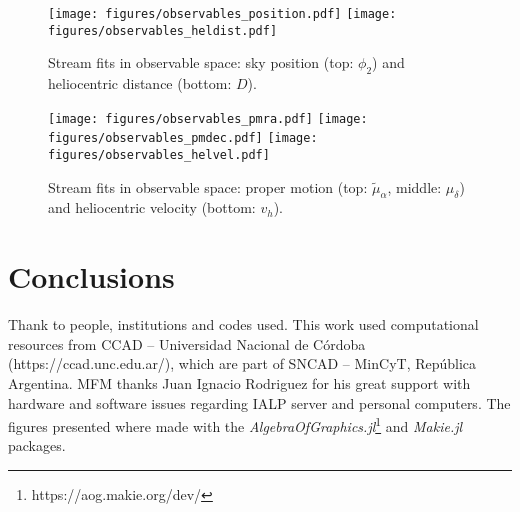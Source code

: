 \documentclass[twocolumn]{aa}
\begin{document}
\begin{figure*}
   \centering
   \texttt{[image: figures/observables\_position.pdf]}
   \texttt{[image: figures/observables\_heldist.pdf]}
   \caption{Stream fits in observable space: sky position (top: $\phi_2$) and heliocentric distance (bottom: $D$).}
   \label{fig:obs_pos}
\end{figure*}
\begin{figure*}
   \texttt{[image: figures/observables\_pmra.pdf]}
   \texttt{[image: figures/observables\_pmdec.pdf]}
   \texttt{[image: figures/observables\_helvel.pdf]}
   \caption{Stream fits in observable space: proper motion (top: $\tilde{\mu}_\alpha$, middle: $\mu_\delta$) and heliocentric velocity (bottom: $v_h$).}
   \label{fig:obs_vel}
\end{figure*}



\section{Conclusions}
\label{sec:conclusions}



\begin{acknowledgements}
    Thank to people, institutions and codes used.
    This work used computational resources from CCAD – Universidad Nacional de Córdoba (https://ccad.unc.edu.ar/), which are part of SNCAD – MinCyT, República Argentina.
    MFM thanks Juan Ignacio Rodriguez for his great support with hardware and
    software issues regarding IALP server and personal computers.
    The figures presented where made with the
    {\it AlgebraOfGraphics.jl}\footnote{https://aog.makie.org/dev/} and
    {\it Makie.jl}~\citep{DanischKrumbiegel2021}
    packages.
\end{acknowledgements}

%
%
%
\end{document}
